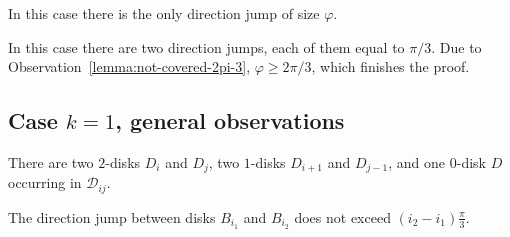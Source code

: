 \begin{enumerate}[label={\bf Case \arabic*: }, wide, labelwidth=!, labelindent=0pt]

In this case there is the only direction jump of size $\varphi$. %


In this case there are two direction jumps, each of them equal to $\pi/3$. Due to Observation~\ref{lemma:not-covered-2pi-3}, $\varphi\geq 2\pi/3$, which finishes the proof.


\subsection{Case $k = 1$, general observations}


There are two $2$-disks $D_i$ and $D_j$, two $1$-disks $D_{i+1}$ and $D_{j-1}$, and one $0$-disk $D$ occurring in $\mathcal{D}_{ij}$.

\begin{observation}\label{lemma:direction-jumps-are-bounded}
The direction jump between disks $B_{i_1}$ and $B_{i_2}$ does not exceed $(i_2 - i_1)\frac{\pi}{3}$.
\end{observation}


\end{enumerate}
